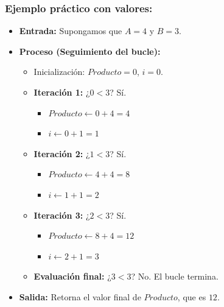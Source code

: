 \documentclass[12pt]{article}
\begin{document}
\subsubsection*{Ejemplo práctico con valores:}
\begin{itemize}
    \item \textbf{Entrada:} Supongamos que $A = 4$ y $B = 3$.
    \item \textbf{Proceso (Seguimiento del bucle):}
    \begin{itemize}
        \item Inicialización: $Producto = 0$, $i = 0$.
        \item \textbf{Iteración 1:} ¿$0 < 3$? Sí. 
        \begin{itemize}
            \item $Producto \leftarrow 0 + 4 = 4$
            \item $i \leftarrow 0 + 1 = 1$
        \end{itemize}
        \item \textbf{Iteración 2:} ¿$1 < 3$? Sí. 
        \begin{itemize}
            \item $Producto \leftarrow 4 + 4 = 8$
            \item $i \leftarrow 1 + 1 = 2$
        \end{itemize}
        \item \textbf{Iteración 3:} ¿$2 < 3$? Sí. 
        \begin{itemize}
            \item $Producto \leftarrow 8 + 4 = 12$
            \item $i \leftarrow 2 + 1 = 3$
        \end{itemize}
        \item \textbf{Evaluación final:} ¿$3 < 3$? No. El bucle termina.
    \end{itemize}
    \item \textbf{Salida:} Retorna el valor final de $Producto$, que es $12$.
\end{itemize}
\end{document}
